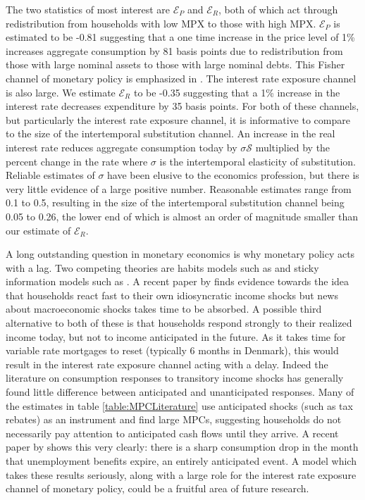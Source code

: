\documentclass[titlepage]{\econtex}\newcommand{\texname}{ConsumptionHeterogeneity}
\begin{document}
The two statistics of most interest are $\mathcal{E}_P$ and $\mathcal{E}_R$, both of which act through redistribution from households with low MPX to those with high MPX. $\mathcal{E}_P$ is estimated to be -0.81 suggesting that a one time increase in the price level of 1\% increases aggregate consumption by 81 basis points due to redistribution from those with large nominal assets to those with large nominal debts. This Fisher channel of monetary policy is emphasized in \cite{doepke_inflation_2006}. The interest rate exposure channel is also large. We estimate  $\mathcal{E}_R$ to be -0.35 suggesting that a 1\% increase in the interest rate decreases expenditure by 35 basis points. For both of these channels, but particularly the interest rate exposure channel, it is informative to compare to the size of the intertemporal substitution channel. An increase in the real interest rate reduces aggregate consumption today by $\sigma \mathcal{S}$ multiplied by the percent change in the rate where $\sigma$ is the intertemporal elasticity of substitution. Reliable estimates of $\sigma$ have been elusive to the economics profession, but there is very little evidence of a large positive number. Reasonable estimates range from 0.1 to 0.5, resulting in the size of the intertemporal substitution channel being 0.05 to 0.26, the lower end of which is almost an order of magnitude smaller than our estimate of $\mathcal{E}_R$.
\begin{center}
	\label{table:suff_stats}
	
\end{center}
A long outstanding question in monetary economics is why monetary policy acts with a lag. Two competing theories are habits models such as \cite{fuhrer_habit_2000} and sticky information models such as \cite{mankiw_sticky_2002}. A recent paper by \cite{carroll_sticky_2018} finds evidence towards the idea that households react fast to their own idiosyncratic income shocks but news about macroeconomic shocks takes time to be absorbed. A possible third alternative to both of these is that households respond strongly to their realized income today, but not to income anticipated in the future. As it takes time for variable rate mortgages to reset (typically 6 months in Denmark), this would result in the interest rate exposure channel acting with a delay. Indeed the literature on consumption responses to transitory income shocks has generally found little difference between anticipated and unanticipated responses. Many of the estimates in table \ref{table:MPCLiterature} use anticipated shocks (such as tax rebates) as an instrument and find large MPCs, suggesting households do not necessarily pay attention to anticipated cash flows until they arrive. A recent paper by \cite{ganong_consumer_2017} shows this very clearly: there is a sharp consumption drop in the month that unemployment benefits expire, an entirely anticipated event. A model which takes these results seriously, along with a large role for the interest rate exposure channel of monetary policy, could be a fruitful area of future research. 
\end{document}
